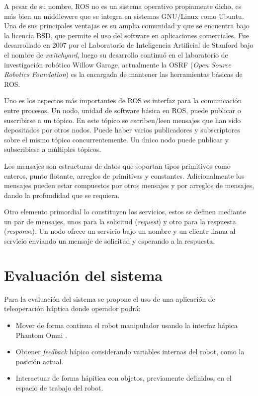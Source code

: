 A pesar de su nombre, ROS no es un sistema operativo propiamente dicho, es más bien un middlewere que se integra en sistemas GNU/Linux como Ubuntu. Una de sus principales ventajas es su amplia comunidad y que se encuentra bajo la licencia BSD, que permite el uso del software en aplicaciones comerciales. Fue desarrollado en 2007 por el Laboratorio de Inteligencia Artificial de Stanford bajo el nombre de \textit{switchyard}, luego su desarrollo continuó en el laboratorio de investigación robótico Willow Garage, actualmente la OSRF (\textit{Open Source Robotics Foundation}) es la encargada de mantener las herramientas básicas de ROS.

Uno es los aspectos más importantes de ROS es interfaz para la comunicación entre procesos. Un nodo, unidad de software básica en ROS, puede publicar o suscribirse a un tópico. En este tópico se escriben/leen mensajes que han sido depositados por otros nodos. Puede haber varios publicadores y subscriptores sobre el mismo tópico concurrentemente. Un único nodo puede publicar y subscribiese a múltiples tópicos.

Los mensajes son estructuras de datos que soportan tipos primitivos como
enteros, punto flotante, arreglos de primitivas y constantes. Adicionalmente los mensajes pueden estar compuestos por otros mensajes y por arreglos de mensajes, dando la profundidad que se requiera.

Otro elemento primordial lo constituyen los servicios, estos se definen mediante un par de mensajes, unos para la solicitud (\textit{request}) y otro para la respuesta (\textit{response}). Un nodo ofrece un servicio bajo un nombre y un cliente llama al servicio enviando un mensaje de solicitud y esperando a la respuesta.

\section{Evaluación del sistema}

Para la evaluación del sistema se propone el uso de una aplicación de teleoperación háptica donde operador podrá:

\begin{itemize}

\item Mover de forma continua el robot manipulador usando la interfaz hápica Phantom Omni \texttrademark.
\item Obtener \textit{feedback} hápico considerando variables internas del robot, como la posición actual.
\item Interactuar de forma hápitica con objetos, previamente definidos, en el espacio de trabajo del robot.

\end{itemize}
